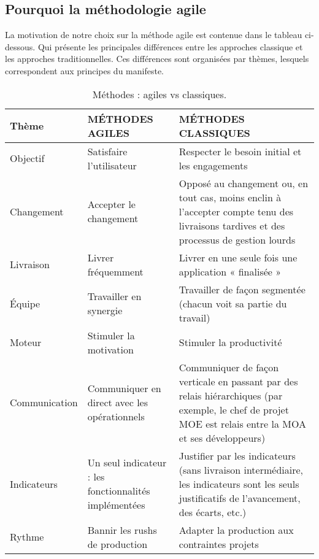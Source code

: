{{\subsection{Pourquoi la méthodologie agile}

La motivation de notre choix sur la méthode agile est contenue dans le tableau ci-dessous. Qui présente les principales différences entre les approches classique et les approches traditionnelles. Ces différences sont organisées par thèmes, lesquels correspondent aux principes du manifeste.


\begin{table}[H]
	\caption{Méthodes : agiles vs classiques.\cite{Ref8}}
	\label{Méthodes : agiles vs classiques.}
	\centering
	\begin{tabularx}{\linewidth}{|X|X|X|}
		\hline \rowcolor{lightgray}  
		\textbf{Thème} & \textbf{MÉTHODES AGILES} & \textbf{MÉTHODES CLASSIQUES}\\
		\hline
		Objectif & Satisfaire l’utilisateur &  Respecter le besoin initial et les engagements\\
		\hline
		Changement & Accepter le changement &  Opposé au changement ou, en tout cas, moins enclin à l’accepter compte tenu des livraisons tardives et des processus de gestion lourds\\
		\hline
		Livraison & Livrer fréquemment  & Livrer en une seule fois une application « finalisée »\\
		\hline
		Équipe  & Travailler en synergie &  Travailler de façon segmentée (chacun voit sa partie du travail) \\	
		\hline
		Moteur & Stimuler la motivation  & Stimuler la productivité\\
		\hline
		Communication  & Communiquer en direct avec les opérationnels & Communiquer de façon verticale en passant par
		des relais hiérarchiques (par exemple, le chef de projet MOE est relais entre la MOA et ses développeurs)\\
		\hline
		Indicateurs &Un seul indicateur : les fonctionnalités
		implémentées & Justifier par les indicateurs (sans livraison
		intermédiaire, les indicateurs sont les seuls
		justificatifs de l’avancement, des écarts, etc.) \\
		\hline
		Rythme & Bannir les rushs de production & Adapter la production aux contraintes projets \\
		\hline

\end{tabularx}
\end{table}}}
